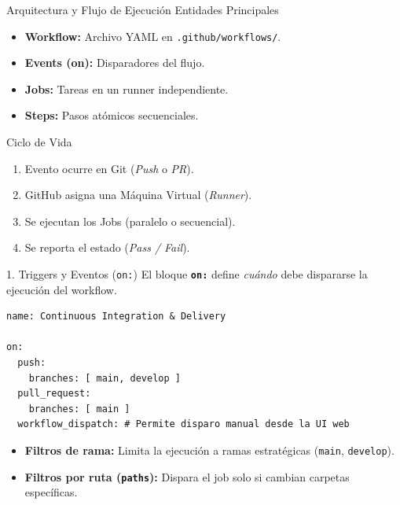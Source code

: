 \documentclass[aspectratio=169]{beamer}
\begin{document}
\contentSlideTwoCols
  {Arquitectura y Flujo de Ejecución}
  {Entidades Principales}
  {
    \begin{itemize}
      \item \textbf{Workflow:} Archivo YAML en \texttt{.github/workflows/}.
      \item \textbf{Events (on):} Disparadores del flujo.
      \item \textbf{Jobs:} Tareas en un runner independiente.
      \item \textbf{Steps:} Pasos atómicos secuenciales.
    \end{itemize}
  }
  {Ciclo de Vida}
  {
    \begin{enumerate}
      \item Evento ocurre en Git (\textit{Push} o \textit{PR}).
      \item GitHub asigna una Máquina Virtual (\textit{Runner}).
      \item Se ejecutan los Jobs (paralelo o secuencial).
      \item Se reporta el estado (\textit{Pass / Fail}).
    \end{enumerate}
  }


\begin{frame}[fragile]{1. Triggers y Eventos (\texttt{on:})}
  \vspace{0.1cm}
  El bloque \textbf{\texttt{on:}} define \textit{cuándo} debe dispararse la ejecución del workflow.
  \vspace{0.15cm}
  \begin{lstlisting}[style=yamllst]
name: Continuous Integration & Delivery

on:
  push:
    branches: [ main, develop ]
  pull_request:
    branches: [ main ]
  workflow_dispatch: # Permite disparo manual desde la UI web
  \end{lstlisting}
  \vspace{0.1cm}
  \begin{itemize}
    \item \textbf{Filtros de rama:} Limita la ejecución a ramas estratégicas (\texttt{main}, \texttt{develop}).
    \item \textbf{Filtros por ruta (\texttt{paths}):} Dispara el job solo si cambian carpetas específicas.
  \end{itemize}
\end{frame}
\end{document}
